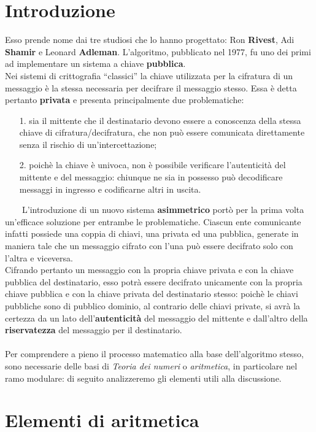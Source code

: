 \documentclass[a4paper,12pt]{article}
\begin{document}
\section*{Introduzione}
Esso prende nome dai tre studiosi che lo hanno progettato: Ron \textbf{Rivest}, Adi \textbf{Shamir} e Leonard \textbf{Adleman}. L'algoritmo, pubblicato nel 1977, fu uno dei primi ad implementare un sistema a chiave \textbf{pubblica}.\\
Nei sistemi di crittografia ``classici'' la chiave utilizzata per la cifratura di un messaggio è la stessa necessaria per decifrare il messaggio stesso. Essa è detta pertanto \textbf{privata} e presenta principalmente due problematiche:
\begin{enumerate}
    \item[1.] sia il mittente che il destinatario devono essere a conoscenza della stessa chiave di cifratura/decifratura, che non può essere comunicata direttamente senza il rischio di un'intercettazione;
    \item[2.] poichè la chiave è univoca, non è possibile verificare l'autenticità del mittente e del messaggio: chiunque ne sia in possesso può decodificare messaggi in ingresso e codificarne altri in uscita.
\end{enumerate}
\ \ \ \ L'introduzione di un nuovo sistema \textbf{asimmetrico} portò per la prima volta un'efficace soluzione per entrambe le problematiche. Ciascun ente comunicante infatti possiede una coppia di chiavi, una privata ed una pubblica, generate in maniera tale che un messaggio cifrato con l'una può essere decifrato solo con l'altra e viceversa.\\
Cifrando pertanto un messaggio con la propria chiave privata e con la chiave pubblica del destinatario, esso potrà essere decifrato unicamente con la propria chiave pubblica e con la chiave privata del destinatario stesso: poichè le chiavi pubbliche sono di pubblico dominio, al contrario delle chiavi private, si avrà la certezza da un lato dell'\textbf{autenticità} del messaggio del mittente e dall'altro della \textbf{riservatezza} del messaggio per il destinatario.\\\\
Per comprendere a pieno il processo matematico alla base dell'algoritmo stesso, sono necessarie delle basi di \emph{Teoria dei numeri} o \emph{aritmetica}, in particolare nel ramo modulare: di seguito analizzeremo gli elementi utili alla discussione.
\newpage
\section{Elementi di aritmetica}
\end{document}

